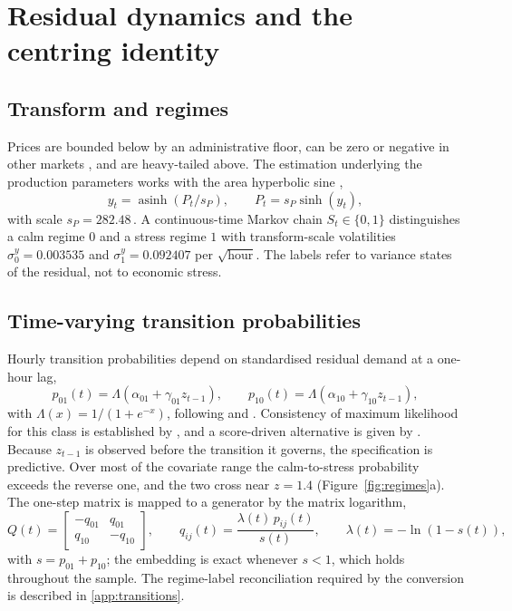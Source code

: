 \section{Residual dynamics and the centring identity}
\label{sec:residual}

\subsection{Transform and regimes}

Prices are bounded below by an administrative floor, can be zero or negative in
other markets \citep{AustHorsch2020}, and are heavy-tailed above. The
estimation underlying the production parameters works with the area hyperbolic
sine \citep{Schneider2011,Uniejewski2018},
\begin{equation}
  y_t=\operatorname{asinh}\!\left(P_t/s_P\right),\qquad P_t=s_P\sinh(y_t),
  \label{eq:asinh}
\end{equation}
with scale $s_P=282.48$\,\TRY. A continuous-time Markov chain
$S_t\in\{0,1\}$ distinguishes a calm regime $0$ and a stress regime $1$ with
transform-scale volatilities $\sigma^y_0=0.003535$ and
$\sigma^y_1=0.092407$ per $\sqrt{\text{hour}}$. The labels refer to variance
states of the residual, not to economic stress.

\subsection{Time-varying transition probabilities}

Hourly transition probabilities depend on standardised residual demand at a
one-hour lag,
\begin{equation}
  p_{01}(t)=\Lambda\!\left(\alpha_{01}+\gamma_{01}z_{t-1}\right),\qquad
  p_{10}(t)=\Lambda\!\left(\alpha_{10}+\gamma_{10}z_{t-1}\right),
  \label{eq:tvtp}
\end{equation}
with $\Lambda(x)=1/(1+e^{-x})$, following \citet{Diebold1994} and \citet{Filardo1994}. Consistency of maximum
likelihood for this class is established by \citet{Pouzo2022}, and a
score-driven alternative is given by \citet{Bazzi2017}. Because $z_{t-1}$ is
observed before the transition it governs, the specification is predictive.
Over most of the covariate range the calm-to-stress probability exceeds the
reverse one, and the two cross near $z=1.4$ (Figure~\ref{fig:regimes}a). The
one-step matrix is mapped to a generator by the matrix logarithm,
\begin{equation}
  Q(t)=\begin{bmatrix}-q_{01}&q_{01}\\ q_{10}&-q_{10}\end{bmatrix},\qquad
  q_{ij}(t)=\frac{\lambda(t)\,p_{ij}(t)}{s(t)},\qquad
  \lambda(t)=-\ln\!\left(1-s(t)\right),
  \label{eq:generator}
\end{equation}
with $s=p_{01}+p_{10}$; the embedding is exact whenever $s<1$, which holds
throughout the sample. The regime-label reconciliation required by the
conversion is described in \ref{app:transitions}.

